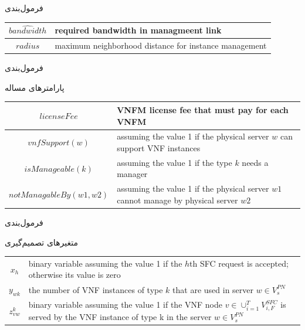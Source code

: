 \documentclass{beamer}
\begin{document}
\begin{persian}
\begin{frame}{فرمول‌بندی}
\begin{center}
\begin{latin}
\begin{tabular}{|c|p{5cm}|}
        \hline
        \(\hat{bandwidth}\) & required bandwidth in managmeent link \\
        \hline
        \(radius\) & maximum neighborhood distance for instance management \\
        \hline
    \end{tabular}\end{latin}\end{center}
\end{frame}
\begin{frame}{فرمول‌بندی}
    \par پارامترهای مساله
    \begin{center}\begin{latin}\begin{tabular}{|c|p{5cm}|}
        \hline
        \(licenseFee\) & VNFM license fee that must pay for each VNFM \\
        \hline
        \(vnfSupport(w)\) & assuming the value 1 if the physical server \(w\) can support VNF instances \\
        \hline
        \(isManageable(k)\) & assuming the value 1 if the type \(k\) needs a manager \\
        \hline
        \(notManagableBy(w1, w2)\) & assuming the value 1 if the physical server \(w1\) cannot manage by physical server \(w2\) \\
        \hline
    \end{tabular}\end{latin}\end{center}
\end{frame}
\begin{frame}{فرمول‌بندی}
    \par
    متغیرهای تصمیم‌گیری
    \begin{latin}\begin{tabular}{c p{10cm}}
        $x_h$ & binary variable assuming the value 1 if the $h$th SFC request is accepted; otherwise its value is zero \\
        $y_{wk}$ & the number of VNF instances of type $k$ that are used in server $w \in V_s^{PN}$ \\
        $z^k_{vw}$ & binary variable assuming the value 1 if the VNF node $v \in \cup_{i=1}^{T} V_{i, F}^{SFC}$ is served by the VNF instance of type k in the server $w \in V_s^{PN}$ \\

\end{tabular}
\end{latin}
\end{frame}
\end{persian}
\end{document}
